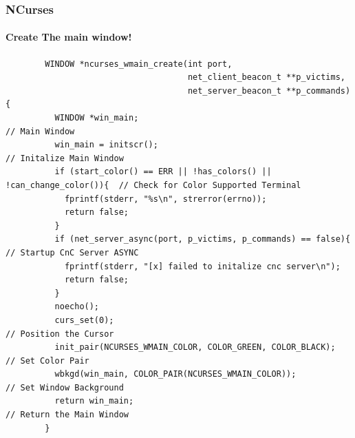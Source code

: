 \documentclass[aspectratio=169]{beamer}
\begin{document}
\begin{frame}[fragile]{}
  \frametitle{NCurses}
  \framesubtitle{Create The main window!}
  \begin{center}
    \begin{tcolorbox}[title=net.c,colback=black]
    \begin{minipage}{0.5\textwidth}
      \begin{verbatim}
        WINDOW *ncurses_wmain_create(int port,
                                     net_client_beacon_t **p_victims,
                                     net_server_beacon_t **p_commands){
          WINDOW *win_main;                                                   // Main Window
          win_main = initscr();                                               // Initalize Main Window
          if (start_color() == ERR || !has_colors() || !can_change_color()){  // Check for Color Supported Terminal
            fprintf(stderr, "%s\n", strerror(errno));
            return false;
          }
          if (net_server_async(port, p_victims, p_commands) == false){        // Startup CnC Server ASYNC
            fprintf(stderr, "[x] failed to initalize cnc server\n");
            return false;
          }
          noecho();
          curs_set(0);                                                        // Position the Cursor
          init_pair(NCURSES_WMAIN_COLOR, COLOR_GREEN, COLOR_BLACK);           // Set Color Pair
          wbkgd(win_main, COLOR_PAIR(NCURSES_WMAIN_COLOR));                   // Set Window Background
          return win_main;                                                    // Return the Main Window
        }
      \end{verbatim}
    \end{minipage}
    \end{tcolorbox}
  \end{center}
\end{frame}
\end{document}
